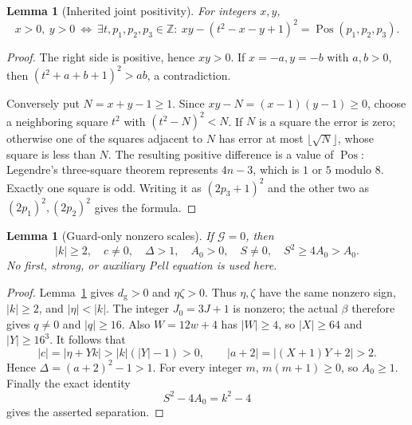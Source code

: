 \documentclass[11pt,letterpaper]{article}
\newtheorem{lemma}[theorem]{Lemma}
\theoremstyle{remark}\newtheorem{remark}[theorem]{Remark}
\newcommand{\Z}{\mathbb Z}\newcommand{\N}{\mathbb N}\newcommand{\Q}{\mathbb Q}
\newcommand{\Pos}{\operatorname{Pos}}\newcommand{\ZFC}{\operatorname{ZFC}}
\begin{document}
\begin{lemma}[Inherited joint positivity]\label{lem:joint}
For integers $x,y$,
\[
 x>0,\ y>0\ \Longleftrightarrow\
 \exists t,p_1,p_2,p_3\in\Z:\
 xy-(t^2-x-y+1)^2=\Pos(p_1,p_2,p_3).
\]
\end{lemma}
\begin{proof}
The right side is positive, hence $xy>0$. If $x=-a,y=-b$ with $a,b>0$,
then $(t^2+a+b+1)^2>ab$, a contradiction.

Conversely put $N=x+y-1\ge1$. Since $xy-N=(x-1)(y-1)\ge0$, choose a
neighboring square $t^2$ with $(t^2-N)^2<N$. If $N$ is a square the
error is zero; otherwise one of the squares adjacent to $N$ has error
at most $\lfloor\sqrt N\rfloor$, whose square is less than $N$.
The resulting positive difference is a value of $\Pos$:
Legendre's three-square theorem represents $4n-3$, which is $1$ or $5$
modulo $8$. Exactly one square is odd. Writing it as $(2p_3+1)^2$
and the other two as $(2p_1)^2,(2p_2)^2$ gives the formula.
\end{proof}

\begin{lemma}[Guard-only nonzero scales]\label{lem:guard}
If $\mathcal G=0$, then
\[
 |k|\ge2,\quad c\ne0,\quad\Delta>1,\quad A_0>0,\quad
 S\ne0,\quad S^2\ge4A_0>A_0.
\]
No first, strong, or auxiliary Pell equation is used here.
\end{lemma}
\begin{proof}
Lemma~\ref{lem:joint} gives $d_{\mathrm g}>0$ and $\eta\zeta>0$.
Thus $\eta,\zeta$ have the same nonzero sign, $|k|\ge2$, and
$|\eta|<|k|$. The integer $J_0=3J+1$ is nonzero; the actual $\beta$
therefore gives $q\ne0$ and $|q|\ge16$.
Also $W=12w+4$ has $|W|\ge4$, so $|X|\ge64$ and $|Y|\ge16^3$.
It follows that
\[
 |c|=|\eta+Yk|>|k|(|Y|-1)>0,\qquad
 |a+2|=|(X+1)Y+2|>2.
\]
Hence $\Delta=(a+2)^2-1>1$.
For every integer $m$, $m(m+1)\ge0$, so $A_0\ge1$.
Finally the exact identity
\begin{equation}\label{eq:Ssep}S^2-4A_0=k^2-4\end{equation}
gives the asserted separation.
\end{proof}
\end{document}
